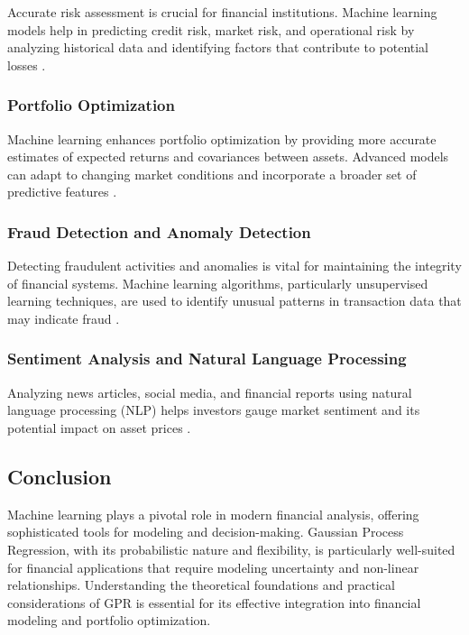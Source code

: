 Accurate risk assessment is crucial for financial institutions. Machine learning models help in predicting credit risk, market risk, and operational risk by analyzing historical data and identifying factors that contribute to potential losses \cite{lessmann2015benchmarking}.

\subsubsection{Portfolio Optimization}

Machine learning enhances portfolio optimization by providing more accurate estimates of expected returns and covariances between assets. Advanced models can adapt to changing market conditions and incorporate a broader set of predictive features \cite{heaton2017deep}.

\subsubsection{Fraud Detection and Anomaly Detection}

Detecting fraudulent activities and anomalies is vital for maintaining the integrity of financial systems. Machine learning algorithms, particularly unsupervised learning techniques, are used to identify unusual patterns in transaction data that may indicate fraud \cite{phua2010comprehensive}.

\subsubsection{Sentiment Analysis and Natural Language Processing}

Analyzing news articles, social media, and financial reports using natural language processing (NLP) helps investors gauge market sentiment and its potential impact on asset prices \cite{hagenau2013automated}.


\subsection{Conclusion}

Machine learning plays a pivotal role in modern financial analysis, offering sophisticated tools for modeling and decision-making. Gaussian Process Regression, with its probabilistic nature and flexibility, is particularly well-suited for financial applications that require modeling uncertainty and non-linear relationships. Understanding the theoretical foundations and practical considerations of GPR is essential for its effective integration into financial modeling and portfolio optimization.


